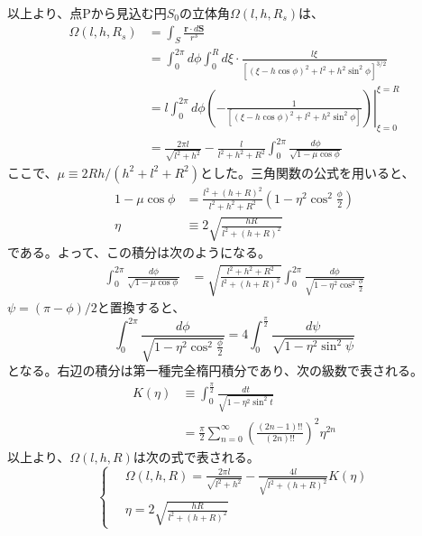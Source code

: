 \documentclass[11pt, titlepage, openany]{ltjsbook}
\begin{document}
以上より、点Pから見込む円$S_0$の立体角$\Omega(l, h, R_s)$は、
\begin{align}
    \Omega(l, h, R_s)
    & = \int_{S} \frac{\bm{r} \cdot d\bm{S}}{r^3} \\
    & = \int_{0}^{2\pi} d\phi \int_{0}^{R} d\xi \cdot \frac{l\xi}{\left[ (\xi - h \cos\phi)^2 + l^2 + h^2 \sin^2\phi \right]^{3/2}} \\
    & = l \int_{0}^{2\pi} d\phi \left. \left( - \frac{1}{\left[(\xi - h\cos\phi)^2 + l^2 + h^2 \sin^2\phi \right]} \right) \right|_{\xi=0}^{\xi=R} \\
    & = \frac{2 \pi l}{\sqrt{l^2 + h^2}} - \frac{l}{l^2 + h^2 + R^2} \int_{0}^{2\pi} \frac{d\phi}{\sqrt{1 - \mu \cos\phi}}
\end{align}
ここで、$\mu \equiv 2Rh/(h^2 + l^2 + R^2)$とした。三角関数の公式を用いると、
\begin{align}
    1 - \mu\cos\phi & = \frac{l^2 + (h + R)^2}{l^2 + h^2 + R^2} \left( 1 - \eta^2 \cos^2 \frac{\phi}{2} \right) \\
    \eta & \equiv 2 \sqrt{\frac{hR}{l^2 + (h + R)^2}}
\end{align}
である。よって、この積分は次のようになる。
\begin{align}
    \int_{0}^{2\pi} \frac{d\phi}{\sqrt{1 - \mu \cos\phi}}
    & = \sqrt{\frac{l^2 + h^2 + R^2}{l^2 + (h + R)^2}} \int_{0}^{2\pi} \frac{d\phi}{\sqrt{1 - \eta^2 \cos^2 \frac{\phi}{2}}}
\end{align}
$\psi = (\pi - \phi) / 2$と置換すると、
\begin{equation}
    \int_{0}^{2\pi} \frac{d\phi}{\sqrt{1 - \eta^2 \cos^2 \frac{\phi}{2}}} = 4 \int_{0}^{\frac{\pi}{2}} \frac{d\psi}{\sqrt{1 - \eta^2 \sin^2 \psi}}
\end{equation}
となる。右辺の積分は第一種完全楕円積分であり、次の級数で表される。
\begin{align}
    K(\eta)
    & \equiv \int_{0}^{\frac{\pi}{2}} \frac{dt}{\sqrt{1 - \eta^2 \sin^2 t}}\\
    & = \frac{\pi}{2} \sum_{n=0}^{\infty} \left( \frac{(2n - 1)!!}{(2n)!!} \right)^2 \eta^{2n}
\end{align}
以上より、$\Omega(l, h, R)$は次の式で表される。
\begin{equation}
\left\{ \,
    \begin{aligned}
    & \Omega(l, h, R) = \frac{2 \pi l}{\sqrt{l^2 + h^2}} - \frac{4l}{\sqrt{l^2 + (h + R)^2}} K(\eta)\\
    & \eta = 2 \sqrt{\frac{hR}{l^2 + (h + R)^2}}
    \end{aligned}
\right.
\label{Omformula}
\end{equation}
\end{document}
